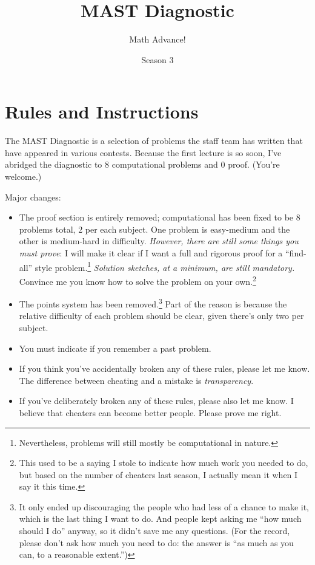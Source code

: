 \documentclass{lucky}
\title{MAST Diagnostic}
\author{Math Advance!}
\date{Season 3}
\begin{document}
\maketitle

\section{Rules and Instructions}

The MAST Diagnostic is a selection of problems the staff team has written that have appeared in various contests. Because the first lecture is so soon, I've abridged the diagnostic to 8 computational problems and 0 proof. (You're welcome.)

Major changes:
\begin{itemize}
\item The proof section is entirely removed; computational has been fixed to be 8 problems total, 2 per each subject. One problem is easy-medium and the other is medium-hard in difficulty. \emph{However, there are still some things you must prove}: I will make it clear if I want a full and rigorous proof for a ``find-all'' style problem.\footnote{Nevertheless, problems will still mostly be computational in nature.} \emph{Solution sketches, at a minimum, are still mandatory.} Convince me you know how to solve the problem on your own.\footnote{This used to be a saying I stole to indicate how much work you needed to do, but based on the number of cheaters last season, I actually mean it when I say it this time.}

\item The points system has been removed.\footnote{It only ended up discouraging the people who had less of a chance to make it, which is the last thing I want to do. And people kept asking me ``how much should I do'' anyway, so it didn't save me any questions. (For the record, please don't ask how much you need to do: the answer is ``as much as you can, to a reasonable extent.'')} Part of the reason is because the relative difficulty of each problem should be clear, given there's only two per subject.

\item You must indicate if you remember a past problem.

\item If you think you've accidentally broken any of these rules, please let me know. The difference between cheating and a mistake is \emph{transparency}.

\item If you've deliberately broken any of these rules, please also let me know. I believe that cheaters can become better people. Please prove me right.
\end{itemize}
\end{document}
